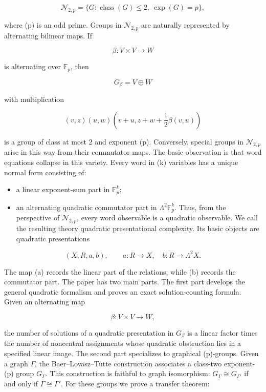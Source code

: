 \documentclass[11pt]{article}
\begin{document}
\[
\mathcal N_{2,p}=\{G:\operatorname{class}(G)\le 2,\ \exp(G)=p\},
\]

where (p) is an odd prime. Groups in $\mathcal N_{2,p}$ are naturally represented by alternating bilinear maps. If

\[
\beta:V\times V\to W
\]

is alternating over $\mathbb F_p$, then

\[
G_\beta=V\oplus W
\]

with multiplication

\[
(v,z)(u,w)
\left(
v+u,
z+w+\frac12\beta(v,u)
\right)
\]

is a group of class at most $2$ and exponent (p). Conversely, special groups in $\mathcal N_{2,p}$ arise in this way from their commutator maps. The basic observation is that word equations collapse in this variety. Every word in (k) variables has a unique normal form consisting of:

\begin{itemize}
\item a linear exponent-sum part in $\mathbb F_p^k$;
\item an alternating quadratic commutator part in $\Lambda^2\mathbb F_p^k$.
Thus, from the perspective of $\mathcal N_{2,p}$, every word observable is a quadratic observable. We call the resulting theory quadratic presentational complexity. Its basic objects are quadratic presentations

\end{itemize}

\[
(X,R,a,b),
\qquad
a:R\to X,\quad b:R\to\Lambda^2X.
\]

The map (a) records the linear part of the relations, while (b) records the commutator part. The paper has two main parts. The first part develops the general quadratic formalism and proves an exact solution-counting formula. Given an alternating map

\[
\beta:V\times V\to W,
\]

the number of solutions of a quadratic presentation in $G_\beta$ is a linear factor times the number of noncentral assignments whose quadratic obstruction lies in a specified linear image. The second part specializes to graphical (p)-groups. Given a graph $\Gamma$, the Baer--Lovasz--Tutte construction associates a class-two exponent-(p) group $G_\Gamma$. This construction is faithful to graph isomorphism: $G_\Gamma\cong G_{\Gamma'}$ if and only if $\Gamma\cong\Gamma'$. For these groups we prove a transfer theorem:
\end{document}
